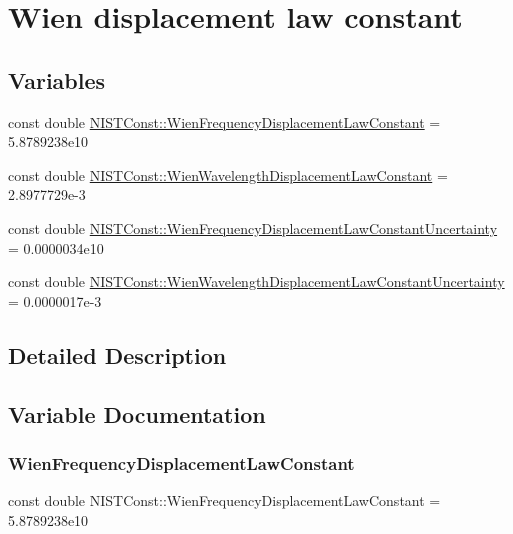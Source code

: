 \hypertarget{group___wien_displacement}{}\section{Wien displacement law constant}
\label{group___wien_displacement}
\subsection*{Variables}
\begin{DoxyCompactItemize}
\item 
const double \hyperlink{group___wien_displacement_ga73d0d9fcd8606de359046224389369e8}{N\+I\+S\+T\+Const\+::\+Wien\+Frequency\+Displacement\+Law\+Constant} = 5.\+8789238e10
\item 
const double \hyperlink{group___wien_displacement_gadd11261f459797b1750250b9d3ada92a}{N\+I\+S\+T\+Const\+::\+Wien\+Wavelength\+Displacement\+Law\+Constant} = 2.\+8977729e-\/3
\item 
const double \hyperlink{group___wien_displacement_gaca098160e158d864be00636a56ef80f0}{N\+I\+S\+T\+Const\+::\+Wien\+Frequency\+Displacement\+Law\+Constant\+Uncertainty} = 0.\+0000034e10
\item 
const double \hyperlink{group___wien_displacement_gaec057ed85042dd0ce17f1f38fdbba4e6}{N\+I\+S\+T\+Const\+::\+Wien\+Wavelength\+Displacement\+Law\+Constant\+Uncertainty} = 0.\+0000017e-\/3
\end{DoxyCompactItemize}


\subsection{Detailed Description}


\subsection{Variable Documentation}
\mbox{\label{group___wien_displacement_ga73d0d9fcd8606de359046224389369e8}} 
\subsubsection{\texorpdfstring{Wien\+Frequency\+Displacement\+Law\+Constant}{WienFrequencyDisplacementLawConstant}}
{\footnotesize\ttfamily const double N\+I\+S\+T\+Const\+::\+Wien\+Frequency\+Displacement\+Law\+Constant = 5.\+8789238e10}

